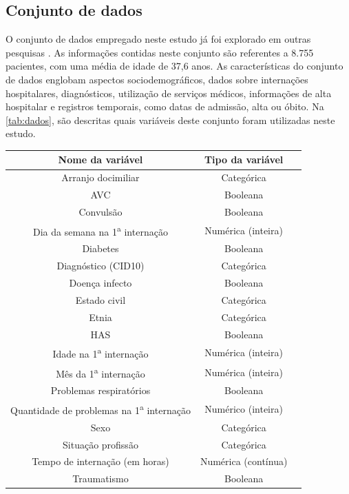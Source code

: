 \subsection{Conjunto de dados}

O conjunto de dados empregado neste estudo já foi explorado em outras pesquisas \cite{barros2016, eHealth, FeatureSensitivity}. As informações contidas neste conjunto são referentes a 8.755 pacientes, com uma média de idade de 37,6 anos. As características do conjunto de dados englobam aspectos sociodemográficos, dados sobre internações hospitalares, diagnósticos, utilização de serviços médicos, informações de alta hospitalar e registros temporais, como datas de admissão, alta ou óbito. Na \autoref{tab:dados}, são descritas quais variáveis deste conjunto foram utilizadas neste estudo.

\begin{table}
	{
		\begin{tabular}{ccc}
			\toprule
			\textbf{Nome da variável} & \textbf{Tipo da variável} \\
			\midrule \midrule
   			Arranjo docimiliar & Categórica \\
   			\midrule
			AVC & Booleana \\
			\midrule
			Convulsão & Booleana \\
			\midrule
			Dia da semana na 1\textsuperscript{a} internação & Numérica (inteira) \\
			\midrule
			Diabetes & Booleana \\
			\midrule
			Diagnóstico (CID10) & Categórica \\
			\midrule
			Doença infecto & Booleana \\
			\midrule
			Estado civil & Categórica \\
			\midrule
			Etnia & Categórica \\
			\midrule
			HAS & Booleana \\
			\midrule
			Idade na 1\textsuperscript{a} internação & Numérica (inteira) \\
			\midrule
			Mês da 1\textsuperscript{a} internação & Numérica (inteira) \\
			\midrule
			Problemas respiratórios & Booleana \\
			\midrule
			Quantidade de problemas na 1\textsuperscript{a} internação & Numérico (inteira) \\
			\midrule
			Sexo & Categórica \\
			\midrule
			Situação profissão & Categórica \\
			\midrule
			Tempo de internação (em horas) & Numérica (contínua) \\
			\midrule
			Traumatismo & Booleana \\
			\bottomrule
		\end{tabular}
	}
	{
	}
\end{table}

